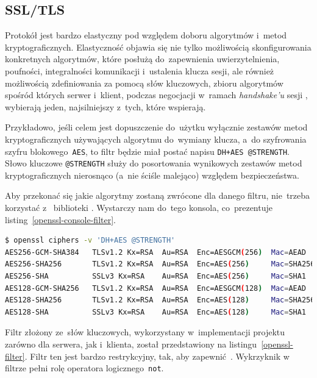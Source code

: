 \documentclass[thesis]{subfiles}
\begin{document}
\subsection{SSL/TLS}
\label{sec:ssl-tls}

Protokół  jest bardzo elastyczny pod względem doboru algorytmów i~metod kryptograficznych. Elastyczność objawia się nie tylko możliwością skonfigurowania konkretnych algorytmów, które posłużą do~zapewnienia uwierzytelnienia, poufności, integralności komunikacji i~ustalenia klucza sesji, ale również możliwością zdefiniowania za pomocą słów kluczowych, zbioru algorytmów spośród których serwer i~klient, podczas negocjacji w~ramach \emph{handshake'u} sesji , wybierają jeden, najsilniejszy z~tych, które wspierają.

Przykładowo, jeśli celem jest dopuszczenie do~użytku wyłącznie zestawów metod kryptograficznych używających algorytmu  do~wymiany klucza, a~do szyfrowania szyfru blokowego~\texttt{AES}, to filtr będzie miał postać napisu \texttt{DH+AES @STRENGTH}. Słowo kluczowe \texttt{@STRENGTH} służy do posortowania wynikowych zestawów metod kryptograficznych nierosnąco (a~nie ściśle malejąco) względem bezpieczeństwa.

Aby przekonać się jakie algorytmy zostaną zwrócone dla danego filtru, nie~trzeba korzystać z~ biblioteki . Wystarczy nam do~tego konsola, co~prezentuje listing~\ref{openssl-console-filter}.\\

\begin{lstlisting}[numbers=none,language=bash,caption={Wynik filtrowania zestawów algorytmów w~konsoli za~pomocą \glstt{openssl}},label=openssl-console-filter]
$ openssl ciphers -v 'DH+AES @STRENGTH'
AES256-GCM-SHA384   TLSv1.2 Kx=RSA  Au=RSA  Enc=AESGCM(256)  Mac=AEAD
AES256-SHA256       TLSv1.2 Kx=RSA  Au=RSA  Enc=AES(256)     Mac=SHA256
AES256-SHA          SSLv3 Kx=RSA    Au=RSA  Enc=AES(256)     Mac=SHA1
AES128-GCM-SHA256   TLSv1.2 Kx=RSA  Au=RSA  Enc=AESGCM(128)  Mac=AEAD
AES128-SHA256       TLSv1.2 Kx=RSA  Au=RSA  Enc=AES(128)     Mac=SHA256
AES128-SHA          SSLv3 Kx=RSA    Au=RSA  Enc=AES(128)     Mac=SHA1
\end{lstlisting}

Filtr złożony ze~słów kluczowych, wykorzystany w~implementacji projektu zarówno dla serwera, jak i~klienta, został przedstawiony na listingu~\ref{openssl-filter}. Filtr ten jest bardzo restrykcyjny, tak, aby zapewnić~. Wykrzyknik w filtrze pełni rolę operatora logicznego~\texttt{not}.\\
\end{document}
